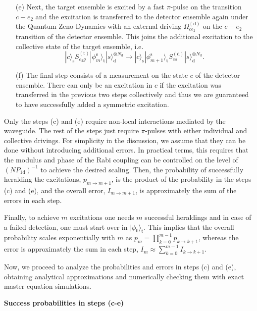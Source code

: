 \documentclass[twocolumn,pra,aps,superscriptaddress,showpacs]{revtex4-1}
\newcommand{\ket}[1]{|#1\rangle}
\def\oned{\mathrm{1d}}
\newcommand{\dtc}{\mathrm{(d)}}
\newcommand{\rs}{\mathrm{s}}
\newcommand{\rd}{\mathrm{d}}
\newcommand{\rt}{\mathrm{t}}
\begin{document}
\begin{enumerate}
	\item [(e)] Next, the target ensemble is excited by a fast $\pi$-pulse on the transition $c - e_2$ and the excitation is transferred to the detector ensemble again under the Quantum Zeno Dynamics with an external driving $\Omega_{c e_2}^\dtc$ on the $c - e_2$ transition of the detector ensemble. This joins the additional excitation to the collective state of the target ensemble, i.e.
	\begin{equation}
	\ket{c}_\rs S_{e_2 g}^{(\rt)}\ket{\phi_m^{\rs}}_\rt \ket{s}^{\otimes N_\rd}_\rd
	\rightarrow
	\ket{c}_\rs \ket{\phi_{m+1}^{\rs}}_\rt S_{cs}^{(\rd)} \ket{s}^{\otimes N_\rd}_\rd.
	\end{equation}
	
	\item [(f)] The final step consists of a measurement on the state $c$ of the detector ensemble. There can only be an excitation in $c$ if the excitation was transferred in the previous two steps collectively and thus we are guaranteed to have successfully added a symmetric excitation. 
\end{enumerate}

Only the steps (c) and (e) require non-local interactions mediated by the waveguide. The rest of the steps just require $\pi$-pulses with either individual and collective drivings. For simplicity in the discussion, we assume that they can be done without introducing additional errors. In practical terms, this requires that the modulus and phase of the Rabi coupling can be controlled on the level of $(N P_\oned)^{-1}$ to achieve the desired scaling. Then, the probability of successfully heralding the excitations, $p_{m\rightarrow m+1}$, is the product of the probability in the steps (c) and (e), and the overall error, $I_{m\rightarrow m+1}$, is approximately the sum of the errors in each step.

Finally, to achieve $m$ excitations one needs $m$ successful heraldings and in case of a failed detection, one must start over in $\ket{\phi_0}_\rt$. This implies that the overall probability scales exponentially with $m$ as $p_m=\prod_{k=0}^{m-1} p_{k\rightarrow k+1}$, whereas the error is approximately the sum in each step, $I_m \approx \sum_{k=0}^{m-1} I_{k\rightarrow k+1}$. 

Now, we proceed to analyze the probabilities and errors in steps (c) and (e), obtaining analytical approximations and numerically checking them with exact master equation simulations.

\textbf{Success probabilities in steps (c-e)}
\end{document}

